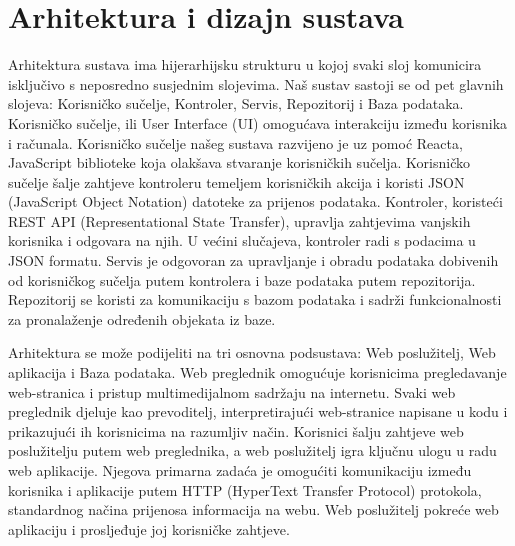 

\chapter{Arhitektura i dizajn sustava}
		
		 Arhitektura sustava ima hijerarhijsku strukturu u kojoj svaki sloj komunicira isključivo s neposredno susjednim slojevima. Naš sustav sastoji se od pet glavnih slojeva: Korisničko sučelje, Kontroler, Servis, Repozitorij i Baza podataka. Korisničko sučelje, ili User Interface (UI) omogućava interakciju između korisnika i računala. Korisničko sučelje našeg sustava razvijeno je uz pomoć Reacta, JavaScript biblioteke koja olakšava stvaranje korisničkih sučelja. Korisničko sučelje šalje zahtjeve kontroleru temeljem korisničkih akcija i koristi JSON (JavaScript Object Notation) datoteke za prijenos podataka. Kontroler, koristeći REST API (Representational State Transfer), upravlja zahtjevima vanjskih korisnika i odgovara na njih. U većini slučajeva, kontroler radi s podacima u JSON formatu. Servis je odgovoran za upravljanje i obradu podataka dobivenih od korisničkog sučelja putem kontrolera i baze podataka putem repozitorija. Repozitorij se koristi za komunikaciju s bazom podataka i sadrži funkcionalnosti za pronalaženje određenih objekata iz baze.	

		Arhitektura se može podijeliti na tri osnovna podsustava: Web poslužitelj, Web aplikacija i Baza podataka. Web preglednik omogućuje korisnicima pregledavanje web-stranica i pristup multimedijalnom sadržaju na internetu. Svaki web preglednik djeluje kao prevoditelj, interpretirajući web-stranice napisane u kodu i prikazujući ih korisnicima na razumljiv način. Korisnici šalju zahtjeve web poslužitelju putem web preglednika, a web poslužitelj igra ključnu ulogu u radu web aplikacije. Njegova primarna zadaća je omogućiti komunikaciju između korisnika i aplikacije putem HTTP (HyperText Transfer Protocol) protokola, standardnog načina prijenosa informacija na webu. Web poslužitelj pokreće web aplikaciju i prosljeđuje joj korisničke zahtjeve.


